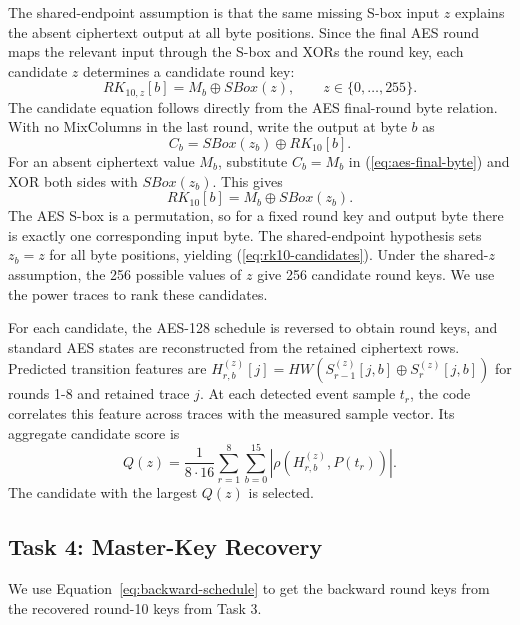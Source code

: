 \documentclass[conference,10pt,letterpaper]{IEEEtran}
\begin{document}
The shared-endpoint assumption is that the same missing S-box input $z$ explains the absent ciphertext output at all byte positions. Since the final AES round maps the relevant input through the S-box and XORs the round key, each candidate $z$ determines a candidate round key:
\begin{equation}
RK_{10,z}[b]=M_b\oplus SBox(z),\qquad z\in\{0,\ldots,255\}.
\label{eq:rk10-candidates}
\end{equation}
The candidate equation follows directly from the AES final-round byte relation. With no MixColumns in the last round, write the output at byte $b$ as
\begin{equation}
C_b=SBox(z_b)\oplus RK_{10}[b].
\label{eq:aes-final-byte}
\end{equation}
For an absent ciphertext value $M_b$, substitute $C_b=M_b$ in (\ref{eq:aes-final-byte}) and XOR both sides with $SBox(z_b)$. This gives
\begin{equation*}
RK_{10}[b]=M_b\oplus SBox(z_b).
\end{equation*}
The AES S-box is a permutation, so for a fixed round key and output byte there is exactly one corresponding input byte. The shared-endpoint hypothesis sets $z_b=z$ for all byte positions, yielding (\ref{eq:rk10-candidates}). Under the shared-$z$ assumption, the 256 possible values of $z$ give 256 candidate round keys. We use the power traces to rank these candidates.

For each candidate, the AES-128 schedule is reversed to obtain round keys, and standard AES states are reconstructed from the retained ciphertext rows. Predicted transition features are $H_{r,b}^{(z)}[j]=HW(S_{r-1}^{(z)}[j,b]\oplus S_r^{(z)}[j,b])$ for rounds 1-8 and retained trace $j$. At each detected event sample $t_r$, the code correlates this feature across traces with the measured sample vector. Its aggregate candidate score is
\begin{equation}
Q(z)=\frac{1}{8\cdot16}\sum_{r=1}^{8}\sum_{b=0}^{15}
\left|\rho\!\left(H_{r,b}^{(z)},P(t_r)\right)\right|.
\label{eq:endpoint-score}
\end{equation}
The candidate with the largest $Q(z)$ is selected.

\subsection{Task 4: Master-Key Recovery}
We use Equation~\eqref{eq:backward-schedule} to get the backward round keys from the recovered round-10 keys from Task 3.
\end{document}
